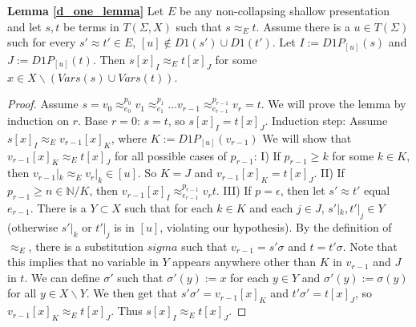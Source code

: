 \noindent \textbf{Lemma \ref{d_one_lemma}   } Let $E$ be any non-collapsing shallow presentation and let $s, t$ be terms in $T(\Sigma, X)$ such that $s \approx_E t$.
Assume there is a $u \in T(\Sigma)$ such for every $s' \approx t' \in E$, $[u]\not\in D1(s') \cup D1(t')$. Let $I := D1P_{[u]}(s)$ and $J := D1P_{[u]}(t)$.
Then $s[x]_I \approx_E t[x]_J$ for some $x \in X \backslash (Vars(s) \cup Vars(t))$. 
\begin{proof}
Assume $s = v_0 \approx_{e_0}^{p_0} v_1 \approx_{e_1}^{p_1} \dots v_{r-1} \approx_{e_{r-1}}^{p_{r-1}} v_{r} = t$.
We will prove the lemma by induction on $r$. 
Base $r=0$: $s = t$, so $s[x]_I = t[x]_J$.
Induction step: Assume $s[x]_I \approx_E v_{r-1}[x]_K$, where $K := D1P_{[u]}(v_{r-1})$ %
We will show that $v_{r-1}[x]_K \approx_E t[x]_J$ for all possible cases of $p_{r-1}$:
I) If $p_{r-1} \ge k$ for some $k \in K$, then $v_{r-1} |_k \approx_E v_r |_k \in [u]$. So $K = J$ and $v_{r-1}[x]_K = t[x]_J$.
II) If $p_{r-1} \ge n \in \mathbb{N} / K$, then $v_{r-1}[x]_I \approx_{e_{r-1}}^{p_{r-1}} v_{r} t$.
III) If $p = \epsilon$, then let $s' \approx t'$ equal $e_{r-1}$. 
There is a $Y \subset X$ such that for each $k \in K$ and each $j \in J$, $s'|_k, t'|_j \in Y$ (otherwise $s'|_k$ or $t'|_j$ is in $[u]$, violating our hypothesis).
By the definition of $\approx_E$, there is a substitution $sigma$ such that $v_{r-1} = s' \sigma$ and $t = t' \sigma$. 
Note that this implies that no variable in $Y$ appears anywhere other than $K$ in $v_{r-1}$ and $J$ in $t$. 
We can define $\sigma'$ such that $\sigma'(y) := x$ for each $y \in Y$ and $\sigma'(y) := \sigma(y)$ for all $y \in X \backslash Y$. 
We then get that $s' \sigma' = v_{r-1}[x]_K$ and $t' \sigma' = t[x]_J$, so $v_{r-1}[x]_K \approx_E t[x]_J$.
Thus $s[x]_I \approx_E t[x]_J$.
\end{proof}


